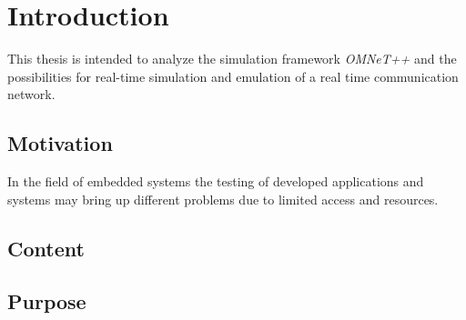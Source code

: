 \chapter{Introduction}
\label{cha:Einleitung}
This thesis is intended to analyze the simulation framework \emph{OMNeT++} and the possibilities for real-time simulation and emulation of a real time communication network.


\section{Motivation}
In the field of embedded systems the testing of developed applications and systems may bring up different problems due to limited access and resources.



\section{Content}

\section{Purpose}


